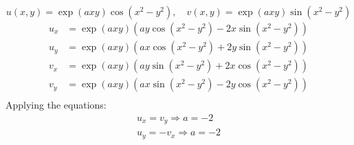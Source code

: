 \documentclass{report}
\renewcommand{\exp}[1]{\operatorname{exp} \left(#1\right)}
\begin{document}
    \begin{equation*}
        u(x,y)=\exp{axy}\cos(x^2-y^2), \quad v(x,y)=\exp{axy}\sin(x^2-y^2)
    \end{equation*}
    \begin{align*}
        u_x&=\exp{axy}(ay\cos(x^2-y^2)-2x\sin(x^2-y^2))\\
        u_y&=\exp{axy}(ax\cos(x^2-y^2)+2y\sin(x^2-y^2)) \\
        v_x&=\exp{axy}(ay\sin(x^2-y^2)+2x\cos(x^2-y^2))\\
        v_y&=\exp{axy}(ax\sin(x^2-y^2)-2y\cos(x^2-y^2)) \\
    \end{align*}
    Applying the equations:\\
    \begin{align*}
        u_x=v_y \Rightarrow a=-2\\
        u_y=-v_x \Rightarrow a=-2\\
    \end{align*}
    
\end{document}
